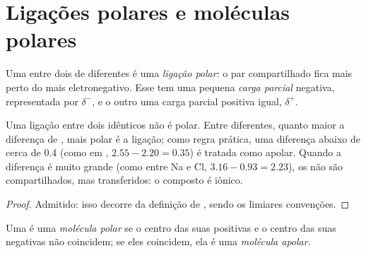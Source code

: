 \section{Ligações polares e moléculas polares}

\begin{definition}\label{def:g11:polarity-and-cohesion:polar-bond}
Uma  entre dois  de  diferentes
é uma \emph{ligação polar}: o par compartilhado fica
mais perto do  mais eletronegativo. Esse  tem uma pequena
\emph{carga parcial} negativa, representada por
$\delta^-$, e o outro  uma carga parcial positiva igual,
$\delta^+$.
\end{definition}

\begin{proposition}\label{prop:g11:polarity-and-cohesion:polar-bond}
Uma ligação entre dois  idênticos não é polar. Entre 
diferentes, quanto maior a diferença de , mais polar
é a ligação; como regra prática, uma diferença abaixo de cerca de 0.4
(como em , $2.55 - 2.20 = 0.35$) é tratada como apolar. Quando a
diferença é muito grande (como entre Na e Cl, $3.16 - 0.93 = 2.23$), os
 não são compartilhados, mas transferidos: o composto é iônico.
\end{proposition}

\begin{proof}
Admitido: isso decorre da definição de , sendo os
limiares convenções.
\end{proof}

\begin{definition}\label{def:g11:polarity-and-cohesion:polar-molecule}
Uma  é uma \emph{molécula polar} se o
centro das suas  positivas e o centro das suas  negativas não coincidem; se eles coincidem, ela é uma
\emph{molécula apolar}.
\end{definition}

